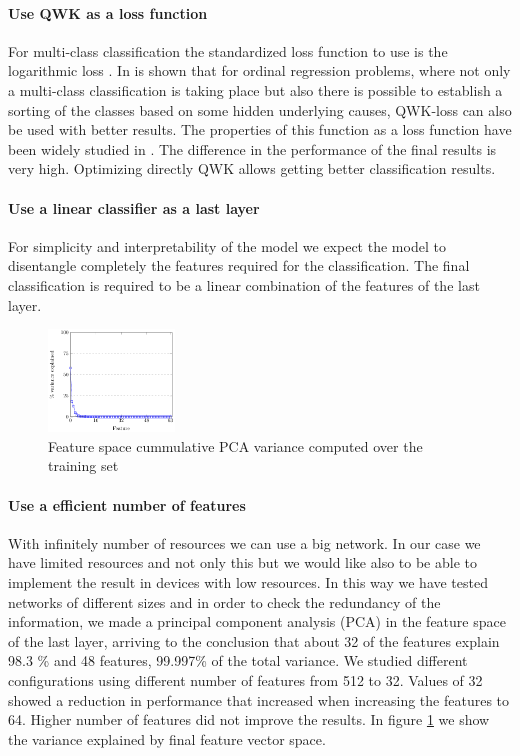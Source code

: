 \documentclass[preprint]{elsarticle}
\theoremstyle{definition} %
\theoremstyle{remark}
\begin{document}
\paragraph{Use QWK as a loss function} For multi-class classification the standardized loss function to use is the logarithmic loss \citep{Goodfellow-et-al-2016}. In \citep{DELATORRE2017} is shown that for ordinal regression problems, where not only a multi-class classification is taking place but also there is possible to establish a sorting of the classes based on some hidden underlying causes, QWK-loss can also be used with better results. The properties of this function as a loss function have been widely studied in \cite{jdelatorre-2017}. The difference in the performance of the final results is very high. Optimizing directly QWK allows getting better classification results.

\paragraph{Use a linear classifier as a last layer} For simplicity and interpretability of the model we expect the model to disentangle completely the features required for the classification. The final classification is required to be a linear combination of the features of the last layer.

\begin{figure}
	\centering
	\includegraphics[width=0.30\textwidth]{figures/PCA-feature-space.pdf}
	\caption{Feature space cummulative PCA variance computed over the training set}
	\label{fig:pca_graph}
\end{figure}

\paragraph{Use a efficient number of features} With infinitely number of resources we can use a big network. In our case we have limited resources and not only this but we would like also to be able to implement the result in devices with low resources. In this way we have tested networks of different sizes and in order to check the redundancy of the information, we made a principal component analysis (PCA) in the feature space of the last layer, arriving to the conclusion that about 32 of the features explain 98.3 \% and 48 features, 99.997\% of the total variance. We studied different configurations using different number of features from 512 to 32. Values of 32 showed a reduction in performance that increased when increasing the features to 64. Higher number of features did not improve the results. In figure \ref{fig:pca_graph} we show the variance explained by final feature vector space.
\end{document}
